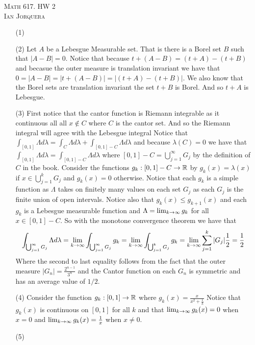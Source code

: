 \documentclass[12pt]{amsart}
\begin{document}
\begin{center}
   \textsc{Math 617. HW 2\\ Ian Jorquera}
\end{center}
\vspace{1em}

\begin{itemize}
   \item[(1)] 
   \item[(2)] Let $A$ be a Lebesgue Measurable set. That is there is a Borel 
   set $B$ such that $|A-B|=0$. Notice that because $t+(A-B)=(t+A)-(t+B)$ and
   becasue the outer measure is translation invariant we have that 
   $0=|A-B|=|t+(A-B)|=|(t+A)-(t+B)|$. We also know that the Borel sets are 
   translation invariant the set $t+B$ is Borel. And so $t+A$ is Lebesgue.
   
   \item[(3)] First notice that the cantor function is Riemann integrable as 
   it continuous all all $x\not\in C$ where $C$ is the cantor set. And so the 
   Riemann integral will agree with the Lebesgue integral
   Notice that $\int_{[0,1]}\Lambda d\lambda = \int_{C}\Lambda d\lambda+ \int_{[0,1]-C}\Lambda d\lambda$
   and because $\lambda(C)=0$ we have that $\int_{[0,1]}\Lambda d\lambda = \int_{[0,1]-C}\Lambda d\lambda$
   where $[0,1]-C=\bigcup_{j=1}^{\infty}G_j$ by the definition of $C$ in the book.
   Consider the functions $g_k:[0,1]-C\rightarrow \mathbb{R}$ by $g_k(x)=\lambda(x)$ 
   if $x\in \bigcup_{j=1}^{k}G_j$ and $g_k(x)=0$ otherwise. Notice that each $g_k$ is a 
   simple function as $\Lambda$ takes on finitely many values on each set $G_j$ as each
   $G_j$ is the finite union of open intervals. Notice also that 
   $g_k(x)\leq g_{k+1}(x)$ and each $g_k$ is a Lebesgue measurable function 
   and $\Lambda=\lim_{k\rightarrow \infty}g_k$ for all $x\in [0,1]-C$.
   So with the monotone convergence theorem we have that
   \[\int_{\bigcup_{j=1}^{\infty}G_j}\Lambda d\lambda=
   \lim_{k\rightarrow \infty}\int_{\bigcup_{j=1}^{\infty}G_j}g_k=
   \lim_{k\rightarrow \infty}\int_{\bigcup_{j=1}^{k}G_j}g_k = 
   \lim_{k\rightarrow \infty}\sum_{j=1}^{k}|G_j|\frac{1}{2}=\frac{1}{2}\]
   Where the second to last equality follows from the fact that the outer measure 
   $|G_n|=\frac{2^{n-1}}{3^n}$ and the Cantor function on each $G_n$ is symmetric 
   and has an average value of $1/2$.

   \item[(4)] Consider the function $g_k:[0,1]\rightarrow \mathbb{R}$ where $g_k(x)=\frac{x}{x^2+\frac{1}{k}}$
               Notice that $g_k(x)$ is continuous on $[0,1]$ for all $k$ and that
               $\lim_{k\rightarrow \infty}g_k(x)=0$ when $x=0$ and 
               $\lim_{k\rightarrow \infty}g_k(x)=\frac{1}{x}$ when $x\neq 0$.

   
   \item[(5)]
\end{itemize}
\end{document}
